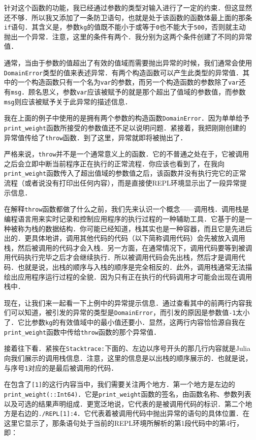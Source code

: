 针对这个函数的功能，我已经通过参数的类型对输入进行了一定的约束．但这显然还不够．所以我又添加了一条防卫语句，也就是处于该函数的函数体最上面的那条\verb|if|语句．其含义是，参数\verb|kg|的值既不能小于或等于\verb|0|也不能大于\verb|500|，否则就主动抛出一个异常．注意，这里的条件有两个．我分别为这两个条件创建了不同的异常值．

通常，当由于参数的值超出了有效的值域而需要抛出异常的时候，我们通常会使用\verb|DomainError|类型的值来表述异常．有两个构造函数可以产生此类型的异常值．其中的一个构造函数只有一个名为\verb|var|的参数，而另一个构造函数的参数除了\verb|var|还有\verb|msg|．顾名思义，参数\verb|var|应该被赋予的就是那个超出了值域的参数值，而参数\verb|msg|则应该被赋予关于此异常的描述信息．

我在上面的例子中使用的是拥有两个参数的构造函数\verb|DomainError|．因为单单给予\verb|print_weight|函数所接受的参数值还不足以说明问题．紧接着，我把刚刚创建的异常值传给了\verb|throw|函数．到了这里，异常就即将被抛出了．

严格来说，\verb|throw|并不是一个通常意义上的函数．它的不普通之处在于，它被调用之后会立即中断当前程序正在执行的正常流程．你应该也看到了，在我向\verb|print_weight|函数传入了超出值域的参数值之后，该函数并没有执行完它的正常流程（或者说没有打印出任何内容），而是直接使REPL环境显示出了一段异常提示信息．

在解释\verb|throw|函数都做了什么之前，我们先来认识一个概念——调用栈．调用栈是编程语言用来实时记录和控制应用程序的执行过程的一种辅助工具．它基于的是一种被称为栈的数据结构．你可能已经知道，栈其实也是一种容器，而且它是先进后出的．更具体地讲，调用其他代码的代码（以下简称调用代码）会先被放入调用栈，然后被调用的代码才会入栈．另一方面，在通常情况下，调用代码要等到被调用代码执行完毕之后才会继续执行．所以被调用代码会先出栈，然后才是调用代码．也就是说，出栈的顺序与入栈的顺序是完全相反的．此外，调用栈通常无法描绘出应用程序运行过程的全貌．因为只有正在执行的代码调用才可能会出现在调用栈中．

现在，让我们来一起看一下上例中的异常提示信息．通过查看其中的前两行内容我们可以知道，被引发的异常的类型是\verb|DomainError|，而引发的原因是参数值\verb|-1|太小了．它比参数\verb|kg|的有效值域中的最小值还要小．显然，这两行内容恰恰源自我在\verb|print_weight|函数中传给\verb|throw|函数的那个异常值．

接着往下看．紧挨在\verb|Stacktrace:|下面的、左边以序号开头的那几行内容就是Julia向我们展示的调用栈信息．注意，这里的信息是以出栈的顺序展示的．也就是说，与序号\verb|1|对应的是最后被调用的代码．

在包含了\verb|[1]|的这行内容当中，我们需要关注两个地方．第一个地方是左边的\verb|print_weight(::Int64)|．它是\verb|print_weight|函数的签名，由函数名称、参数列表以及可选的结果声明组成．更宽泛地说，它代表的是被调用代码的标识．第二个地方是右边的\verb|./REPL[1]:4|．它代表着被调用代码中抛出异常的语句的具体位置．在这里它显示了，那条语句处于当前的REPL环境所解析的第1段代码中的第4行，即：

